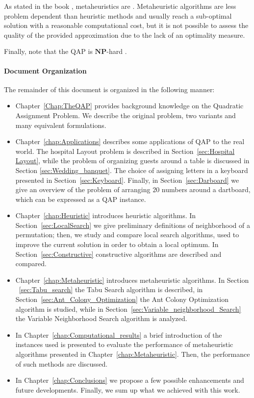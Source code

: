  As stated in the book \cite[p. ix]{Gendreau2019}, metaheuristics are . Metaheuristic algorithms are less problem dependent than heuristic methods and usually reach a sub-optimal solution with a reasonable computational cost, but it is not possible to assess the quality of the provided approximation due to the lack of an optimality measure.

Finally, note that the QAP is $\mathbf{NP}$-hard \cite[Theorem~ 2.1]{Sahni_1976}.


\paragraph{Document Organization} The remainder of this document is organized in the following manner:
\begin{itemize}
\item Chapter~\ref{Chap:TheQAP} provides background knowledge on the Quadratic Assignment Problem. We describe the original problem, two variants and  many equivalent formulations.
\item Chapter~\ref{chap:Applications} describes some applications of QAP to the real world. The hospital Layout problem is described in Section~\ref{sec:Hospital Layout}, while the problem of organizing guests around a table is discussed in Section \ref{sec:Wedding_banquet}. The choice of assigning letters in a keyboard presented in Section~\ref{sec:Keyboard}. Finally, in Section~\ref{sec:Darboard} 
we give an overview of the problem of arranging $20$ numbers around a dartboard, which can be expressed as a QAP instance.
\item Chapter~\ref{chap:Heuristic} introduces heuristic algorithms. In Section~\ref{sec:LocalSearch} we give preliminary definitions of neighborhood of a permutation; then, we study and compare local search algorithms, used to improve the current solution in order to obtain a local optimum. In Section~\ref{sec:Constructive} constructive algorithms are described and compared.
\item Chapter~\ref{chap:Metaheuristic} introduces metaheuristic algorithms. In Section ~\ref{sec:Tabu_search} the Tabu Search algorithm is described, in Section~\ref{sec:Ant_Colony_Optimization} the  Ant Colony Optimization algorithm is studied, while in Section~\ref{sec:Variable_neighborhood_Search} the Variable Neighborhood Search algorithm is analyzed.
\item In Chapter~\ref{chap:Computational_results} a brief introduction of the instances used is presented to evaluate the performance of metaheuristic algorithms presented in Chapter~\ref{chap:Metaheuristic}. Then, the performance of such methods are discussed.
\item In Chapter~\ref{chap:Conclusions} we propose a few possible enhancements and future developments. Finally, we sum up what we achieved with this work.
\end{itemize}
